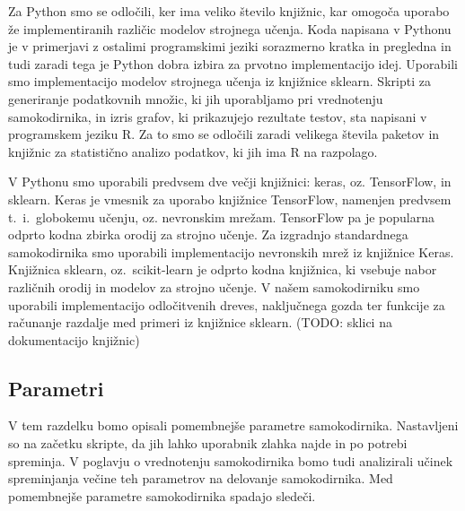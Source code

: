 \documentclass[12pt,a4paper,twoside]{article}
\theoremstyle{definition} %
\theoremstyle{plain} %
\numberwithin{equation}{section}  %
\begin{document}
Za Python smo se odločili, ker ima veliko število knjižnic, kar omogoča uporabo že implementiranih različic modelov strojnega učenja.
Koda napisana v Pythonu je v primerjavi z ostalimi programskimi jeziki sorazmerno kratka in pregledna in tudi zaradi tega je Python dobra izbira za prvotno implementacijo idej.
Uporabili smo implementacijo modelov strojnega učenja iz knjižnice sklearn.
Skripti za generiranje podatkovnih množic, ki jih uporabljamo pri vrednotenju samokodirnika, in izris grafov, ki prikazujejo rezultate testov, sta napisani v programskem jeziku R.
Za to smo se odločili zaradi velikega števila paketov in knjižnic za statistično analizo podatkov, ki jih ima R na razpolago.

V Pythonu smo uporabili predvsem dve večji knjižnici: keras, oz. TensorFlow, in sklearn.
Keras je vmesnik za uporabo knjižnice TensorFlow, namenjen predvsem t.~i.\ globokemu učenju, oz. nevronskim mrežam. 
TensorFlow pa je popularna odprto kodna zbirka orodij za strojno učenje.
Za izgradnjo standardnega samokodirnika smo uporabili implementacijo nevronskih mrež iz knjižnice Keras.
Knjižnica sklearn, oz.\ scikit-learn je odprto kodna knjižnica, ki vsebuje nabor različnih orodij in modelov za strojno učenje.
V našem samokodirniku smo uporabili implementacijo odločitvenih dreves, naključnega gozda ter funkcije za računanje razdalje med primeri iz knjižnice sklearn.
(TODO: sklici na dokumentacijo knjižnic)


\subsection{Parametri}
\label{razdelek-parametri}

V tem razdelku bomo opisali pomembnejše parametre samokodirnika. 
Nastavljeni so na začetku skripte, da jih lahko uporabnik zlahka najde in po potrebi spreminja.
V poglavju o vrednotenju samokodirnika bomo tudi analizirali učinek spreminjanja večine teh parametrov na delovanje samokodirnika.
Med pomembnejše parametre samokodirnika spadajo sledeči.
\end{document}
